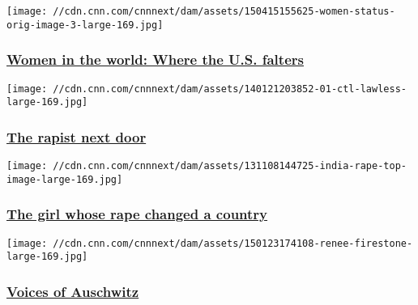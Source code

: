 \href{/2015/04/16/us/american-women-world-rankings/index.html}{}

\texttt{[image: //cdn.cnn.com/cnnnext/dam/assets/150415155625-women-status-orig-image-3-large-169.jpg]}

\hypertarget{women-in-the-world-where-the-us-falters-}{%
\subsubsection{\texorpdfstring{\href{/2015/04/16/us/american-women-world-rankings/index.html}{Women
in the world: Where the U.S. falters
}}{Women in the world: Where the U.S. falters }}\label{women-in-the-world-where-the-us-falters-}}

\href{http://www.cnn.com/interactive/2014/02/opinion/sutter-change-alaska-rape/index.html}{}

\texttt{[image: //cdn.cnn.com/cnnnext/dam/assets/140121203852-01-ctl-lawless-large-169.jpg]}

\hypertarget{the-rapist-next-door}{%
\subsubsection{\texorpdfstring{\href{http://www.cnn.com/interactive/2014/02/opinion/sutter-change-alaska-rape/index.html}{The
rapist next door}}{The rapist next door}}\label{the-rapist-next-door}}

\href{http://www.cnn.com/interactive/2013/11/world/india-rape/}{}

\texttt{[image: //cdn.cnn.com/cnnnext/dam/assets/131108144725-india-rape-top-image-large-169.jpg]}

\hypertarget{the-girl-whose-rape-changed-a-country}{%
\subsubsection{\texorpdfstring{\href{http://www.cnn.com/interactive/2013/11/world/india-rape/}{The
girl whose rape changed a
country}}{The girl whose rape changed a country}}\label{the-girl-whose-rape-changed-a-country}}

\href{http://www.cnn.com/interactive/2015/01/world/auschwitz/index.html}{}

\texttt{[image: //cdn.cnn.com/cnnnext/dam/assets/150123174108-renee-firestone-large-169.jpg]}

\hypertarget{voices-of-auschwitz}{%
\subsubsection{\texorpdfstring{\href{http://www.cnn.com/interactive/2015/01/world/auschwitz/index.html}{Voices
of Auschwitz}}{Voices of Auschwitz}}\label{voices-of-auschwitz}}

